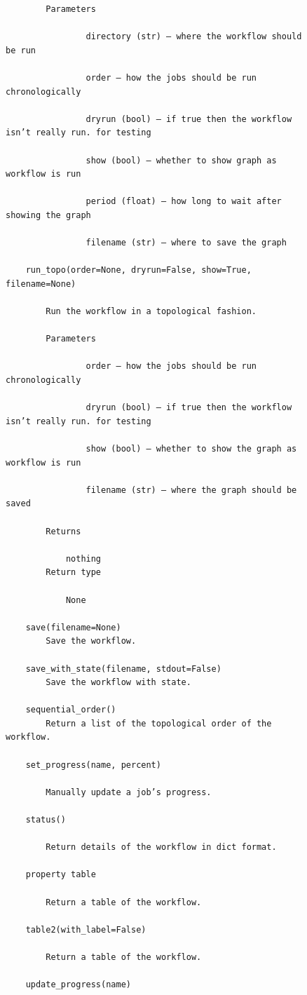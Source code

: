 \begin{figure}[htb]
\begin{verbatim}
        Parameters

                directory (str) – where the workflow should be run

                order – how the jobs should be run chronologically

                dryrun (bool) – if true then the workflow isn’t really run. for testing

                show (bool) – whether to show graph as workflow is run

                period (float) – how long to wait after showing the graph

                filename (str) – where to save the graph

    run_topo(order=None, dryrun=False, show=True, filename=None)

        Run the workflow in a topological fashion.

        Parameters

                order – how the jobs should be run chronologically

                dryrun (bool) – if true then the workflow isn’t really run. for testing

                show (bool) – whether to show the graph as workflow is run

                filename (str) – where the graph should be saved

        Returns

            nothing
        Return type

            None

    save(filename=None)
        Save the workflow.

    save_with_state(filename, stdout=False)
        Save the workflow with state.

    sequential_order()
        Return a list of the topological order of the workflow.

    set_progress(name, percent)

        Manually update a job’s progress.

    status()

        Return details of the workflow in dict format.

    property table

        Return a table of the workflow.

    table2(with_label=False)

        Return a table of the workflow.

    update_progress(name)


\end{verbatim}
\end{figure}
